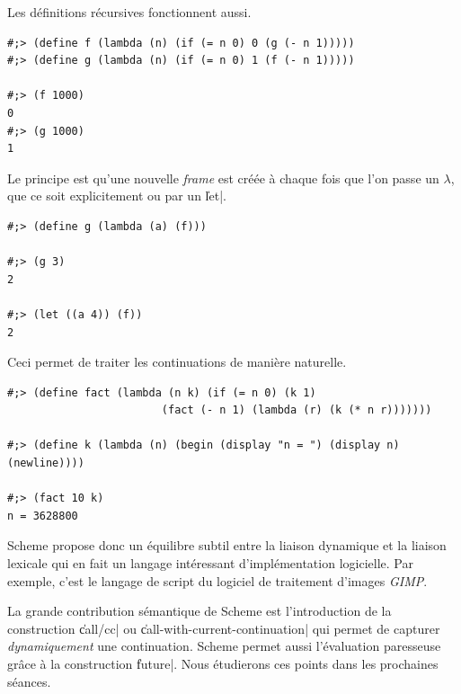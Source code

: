 \documentclass{../../LaTeX/tdsimple}
\begin{document}
Les définitions récursives fonctionnent aussi.
\begin{lstlisting}
#;> (define f (lambda (n) (if (= n 0) 0 (g (- n 1)))))
#;> (define g (lambda (n) (if (= n 0) 1 (f (- n 1)))))

#;> (f 1000)
0
#;> (g 1000)
1
\end{lstlisting}

Le principe est qu'une nouvelle \emph{frame} est créée à chaque fois
que l'on passe un $\lambda$, que ce soit explicitement ou par un
\|let|.
\begin{lstlisting}
#;> (define g (lambda (a) (f)))

#;> (g 3)
2

#;> (let ((a 4)) (f))
2
\end{lstlisting}

Ceci permet de traiter les continuations de manière naturelle.
\begin{lstlisting}
#;> (define fact (lambda (n k) (if (= n 0) (k 1) 
                        (fact (- n 1) (lambda (r) (k (* n r)))))))

#;> (define k (lambda (n) (begin (display "n = ") (display n) (newline))))

#;> (fact 10 k)
n = 3628800
\end{lstlisting}
Scheme propose donc un équilibre subtil entre la liaison dynamique et
la liaison lexicale qui en fait un langage intéressant
d'implémentation logicielle. Par exemple, c'est le langage de script
du logiciel de traitement d'images \emph{GIMP}.

La grande contribution sémantique de Scheme est l'introduction de la
construction \|call/cc| ou \|call-with-current-continuation| qui
permet de capturer \emph{dynamiquement} une continuation. Scheme
permet aussi l'évaluation paresseuse grâce à la construction
\|future|. Nous étudierons ces points dans les prochaines séances.
\end{document}
